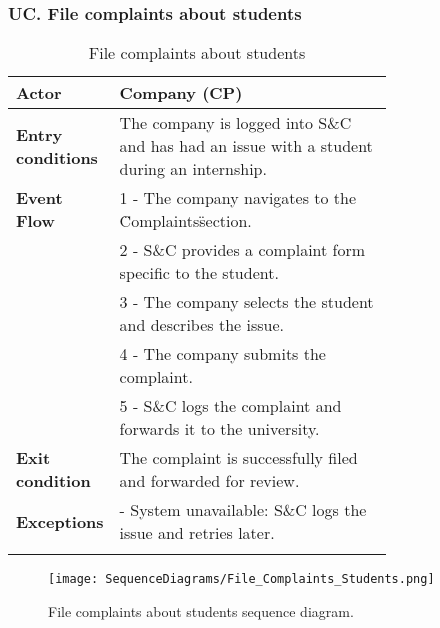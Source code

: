 \subsubsection*{UC\cuc . File complaints about students}
\begin{center}
    \begin{longtable}{|l|p{0.75\linewidth}|}
        \hline
        \textbf{Actor}            & Company (CP) \\
        \hline
        \textbf{Entry conditions} & The company is logged into S\&C and has had an issue with a student during an internship. \\
        \hline
        \textbf{Event Flow}       & 1 - The company navigates to the \"Complaints\" section. \\
        & 2 - S\&C provides a complaint form specific to the student. \\
        & 3 - The company selects the student and describes the issue. \\
        & 4 - The company submits the complaint. \\
        & 5 - S\&C logs the complaint and forwards it to the university. \\
        \hline
        \textbf{Exit condition}   & The complaint is successfully filed and forwarded for review. \\       
        \hline
        \textbf{Exceptions}       & - System unavailable: S\&C logs the issue and retries later. \\
        \hline
        \caption{File complaints about students}
        \label{tab:file_complaints_students_usecase}
    \end{longtable}
\end{center}

\begin{figure}[H]
    \begin{center}
        \texttt{[image: SequenceDiagrams/File\_Complaints\_Students.png]}
        \caption{File complaints about students sequence diagram.}
        \label{fig:file_complaints_students_seqd}%
    \end{center}
\end{figure}


